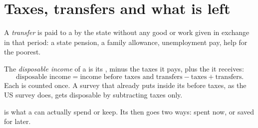 \section{Taxes, transfers and what is left}

\begin{definition}[Transfer]\label{def:g7:households:transfer}
A \emph{transfer} is  paid to a  by the state without any good or
work given in exchange in that period: a state pension, a family allowance, unemployment pay, help
for the poorest.
\end{definition}

\begin{definition}\label{def:g7:households:disposable-income}
The \emph{disposable income} of a  is its , minus the taxes it pays, plus the  it receives:
\[
\text{disposable income} = \text{income before taxes and transfers} - \text{taxes} + \text{transfers}.
\]
Each  is counted once. A survey that already puts  inside its  before
taxes, as the US survey does, gets disposable  by subtracting taxes only.
\end{definition}

 is what a  can actually spend or keep. Its  then goes two ways:
spent now, or saved for later.

